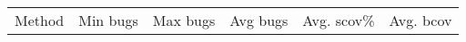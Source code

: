 \begin{table}
\begin{tabular}{l|r|r|r|r|r}
  Method & Min bugs & Max bugs & Avg bugs & Avg. scov\% & Avg. bcov \\
\end{tabular}
\end{table}
